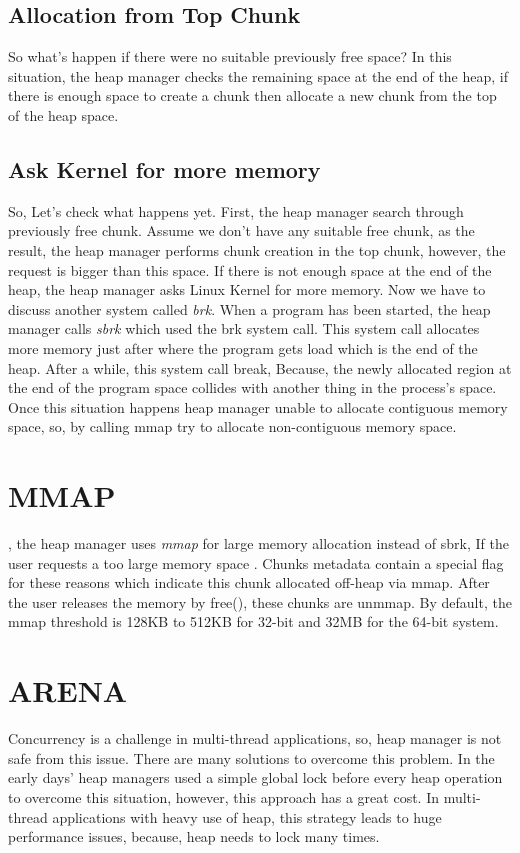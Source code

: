 \documentclass{masterthesis}
\newcommand{\glnote}[1]{\todo[color=yellow!20]{#1}}
\begin{document}
\subsection{Allocation from Top Chunk}
So what’s happen if there were no suitable previously free space? In this situation, the heap manager checks the remaining space at the end of the heap, if there is enough space to create a chunk then allocate a new chunk from the top of the heap space. 

\subsection{Ask Kernel for more memory}
So, Let's check what happens yet. First, the heap manager search through previously free chunk. Assume we don't have any suitable free chunk, as the result, the heap manager performs chunk creation in the top chunk, however, the request is bigger than this space. If there is not enough space at the end of the heap, the heap manager asks Linux Kernel for more memory. Now we have to discuss another system called \emph{brk}. When a program has been started, the heap manager calls \emph{sbrk} which used the brk system call. This system call allocates more memory just after where the program gets load which is the end of the heap. 
After a while, this system call break, Because, the newly allocated region at the end of the program space collides with another thing in the process’s space. Once this situation happens heap manager unable to allocate contiguous memory space, so, by calling mmap try to allocate non-contiguous memory space. 

\section{MMAP}
\glnote{where? I don't see where you mentioned it}, the heap manager uses \emph{mmap} for large memory allocation instead of sbrk, If the user requests a too large memory space . Chunks metadata contain a special flag for these reasons which indicate this chunk allocated off-heap via mmap. After the user releases the memory by free(), these chunks are unmmap. By default, the mmap threshold is 128KB to 512KB for 32-bit and 32MB for the 64-bit system.

\section{ARENA}
Concurrency is a challenge in multi-thread applications, so, heap manager is not safe from this issue. There are many solutions to overcome this problem. In the early days' heap managers used a simple global lock before every heap operation to overcome this situation, however, this approach has a great cost. In multi-thread applications with heavy use of heap, this strategy leads to huge performance issues, because, heap needs to lock many times.
\end{document}
